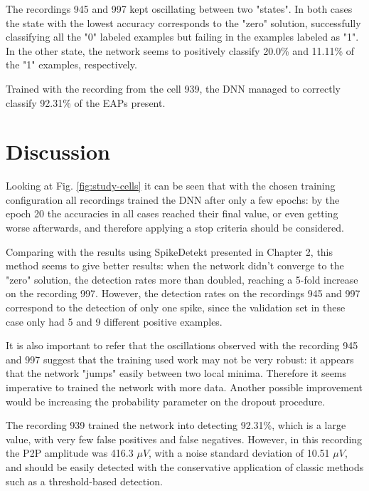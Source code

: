 The recordings 945 and 997 kept oscillating between two "states". In both cases the state with the lowest accuracy corresponds to the "zero" solution, successfully classifying all the "0" labeled examples but failing in the examples labeled as "1". In the other state, the network seems to positively classify 20.0\% and 11.11\% of the "1" examples, respectively.

Trained with the recording from the cell 939, the DNN managed to correctly classify 92.31\% of the EAPs present. 

\section{Discussion}
\label{sec:chap3-discussion}


Looking at Fig. \ref{fig:study-cells} it can be seen that with the chosen training configuration all recordings trained the DNN after only a few epochs: by the epoch 20 the accuracies in all cases reached their final value, or even getting worse afterwards, and therefore applying a stop criteria should be considered.

Comparing with the results using SpikeDetekt presented in Chapter 2, this method seems to give better results: when the network didn't converge to the "zero" solution, the detection rates more than doubled, reaching a 5-fold increase on the recording 997. However, the detection rates on the recordings 945 and 997 correspond to the detection of only one spike, since the validation set in these case only had 5 and 9 different positive examples. 

It is also important to refer that the oscillations observed with the recording 945 and 997 suggest that the training used work may not be very robust: it appears that the network "jumps" easily between two local minima. Therefore it seems imperative to trained the network with more data. Another possible improvement would be increasing the probability parameter on the dropout procedure.

The recording 939 trained the network into detecting 92.31\%, which is a large value, with very few false positives and false negatives. However, in this recording the P2P amplitude was 416.3 $\mu V$, with a noise standard deviation of 10.51 $\mu V$, and should be easily detected with the conservative application of classic methods such as a threshold-based detection.

